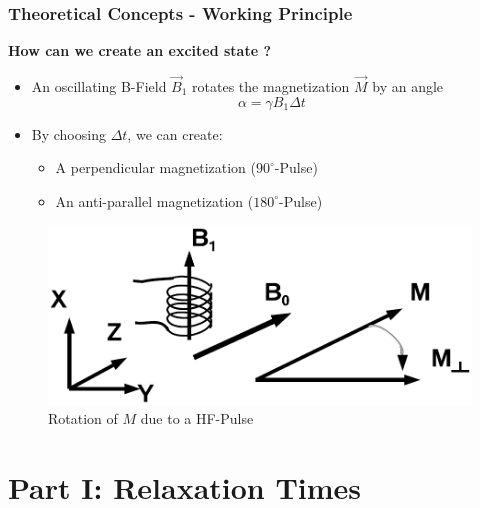 \documentclass[aspectratio=169]{beamer}
\begin{document}
\begin{frame}
	\frametitle{Theoretical Concepts - Working Principle}
	\begin{minipage}[t]{0.65\textwidth}
		\textbf{How can we create an excited state ?}
		\begin{itemize}
			\item An oscillating B-Field $\vec{B}_1$ rotates the magnetization $\vec{M}$ by an angle
			\begin{equation}
				\alpha = \gamma B_1 \Delta t
			\end{equation}
			\item By choosing $\Delta t$, we can create:
			\begin{itemize}
				\item A perpendicular magnetization ($90^\circ$-Pulse)
				\item An anti-parallel magnetization ($180^\circ$-Pulse)
			\end{itemize}
		\end{itemize}
	\end{minipage}
	\hspace*{10pt}
	\begin{minipage}[t]{0.3\textwidth}
		\begin{figure}[H]
			\centering
			\includegraphics[width=\textwidth]{./Resources/hf_pulse.png}
			\caption{Rotation of $M$ due to a HF-Pulse}
		\end{figure}
	\end{minipage}
\end{frame}

\section{Part I: Relaxation Times}
\end{document}
